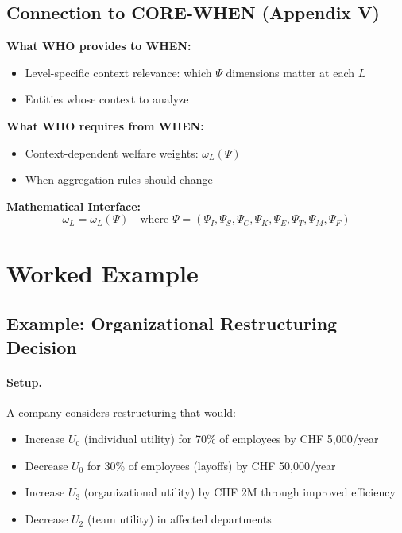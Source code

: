 \subsection{Connection to CORE-WHEN (Appendix V)}

\begin{tcolorbox}[colback=yellow!5!white, colframe=yellow!75!black,
    title=Integration: CORE-WHO $\leftrightarrow$ CORE-WHEN]
\textbf{What WHO provides to WHEN:}
\begin{itemize}[nosep]
\item Level-specific context relevance: which $\Psi$ dimensions matter at each $L$
\item Entities whose context to analyze
\end{itemize}

\textbf{What WHO requires from WHEN:}
\begin{itemize}[nosep]
\item Context-dependent welfare weights: $\omega_L(\Psi)$
\item When aggregation rules should change
\end{itemize}

\textbf{Mathematical Interface:}
\begin{equation}
\omega_L = \omega_L(\Psi) \quad \text{where } \Psi = (\Psi_I, \Psi_S, \Psi_C, \Psi_K, \Psi_E, \Psi_T, \Psi_M, \Psi_F)
\end{equation}
\end{tcolorbox}


\section{Worked Example}
\label{sec:who-example}

\subsection{Example: Organizational Restructuring Decision}

\paragraph{Setup.}
A company considers restructuring that would:
\begin{itemize}
\item Increase $U_0$ (individual utility) for 70\% of employees by CHF 5,000/year
\item Decrease $U_0$ for 30\% of employees (layoffs) by CHF 50,000/year
\item Increase $U_3$ (organizational utility) by CHF 2M through improved efficiency
\item Decrease $U_2$ (team utility) in affected departments
\end{itemize}

